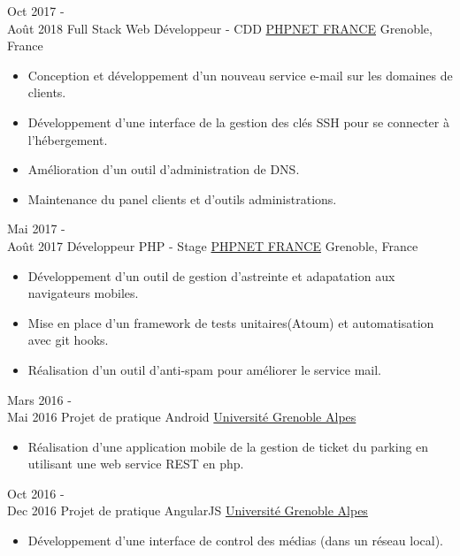 \documentclass[letterpaper]{twentysecondcv} %
\begin{document}
\begin{twenty} %
	\twentyitem
    	{Oct 2017 - \\Août 2018}
        {Full Stack Web Développeur - CDD}
        {\href{https://www.phpnet.org/}{PHPNET FRANCE}}
        {Grenoble, France}
        {
        {\begin{itemize}
        \item Conception et développement d'un nouveau service e-mail sur les domaines de clients.
        \item Développement d'une interface de la gestion des clés SSH pour se connecter à l'hébergement.
        \item Amélioration d'un outil d'administration de DNS.
        \item Maintenance du panel clients et d'outils administrations.
    	\end{itemize}}
        }
        
    \twentyitem
   		{Mai 2017 - \\ Août 2017}
        {Développeur PHP - Stage}
        {\href{https://www.phpnet.org/}{PHPNET FRANCE}}
        {Grenoble, France}
        {
        {\begin{itemize}
        \item Développement d'un outil de gestion d'astreinte et adapatation aux navigateurs mobiles.
        \item Mise en place d'un framework de tests unitaires(Atoum) et automatisation avec git hooks.
        \item Réalisation d'un outil d'anti-spam pour améliorer le service mail.
    \end{itemize}}
        }
    \twentyitem
   		{Mars 2016 - \\ Mai 2016}
        {Projet de pratique Android}
        {\href{https://www.univ-grenoble-alpes.fr//}{Université Grenoble Alpes}}
        {}
        {
        \begin{itemize}
        \item Réalisation d'une application mobile de la gestion de ticket du parking en utilisant une web service REST en php.
    \end{itemize}
    	}
     \twentyitem
   		{Oct 2016 - \\ Dec 2016}
        {Projet de pratique AngularJS}
        {\href{https://www.univ-grenoble-alpes.fr//}{Université Grenoble Alpes}}
        {}
        {
        \begin{itemize}
        \item Développement d'une interface de control des médias (dans un réseau local).
    \end{itemize}
    	}
        

\end{twenty}
\end{document}

